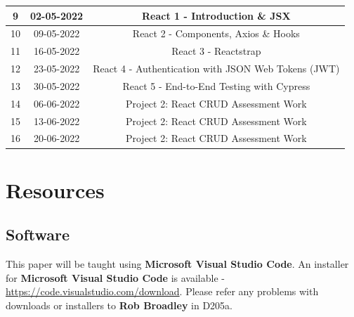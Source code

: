 \documentclass{article}
\begin{document}
\begin{tabular}{|c|c|c|c|}
	\footnotesize 9  & \footnotesize 02-05-2022 & \multicolumn{2}{c|}{\footnotesize React 1 - Introduction \& JSX}                                                                 \\ \hline
	\footnotesize 10 & \footnotesize 09-05-2022 & \multicolumn{2}{c|}{\footnotesize React 2 - Components, Axios \& Hooks}                                                          \\ \hline
	\footnotesize 11 & \footnotesize 16-05-2022 & \multicolumn{2}{c|}{\footnotesize React 3 - Reactstrap}                                                                          \\ \hline
	\footnotesize 12 & \footnotesize 23-05-2022 & \multicolumn{2}{c|}{\footnotesize React 4 - Authentication with JSON Web Tokens (JWT)}                                           \\ \hline
	\footnotesize 13 & \footnotesize 30-05-2022 & \multicolumn{2}{c|}{\footnotesize React 5 - End-to-End Testing with Cypress}                                                     \\ \hline
	\footnotesize 14 & \footnotesize 06-06-2022 & \multicolumn{2}{c|}{\footnotesize Project 2: React CRUD Assessment Work}                                                         \\ \hline
	\footnotesize 15 & \footnotesize 13-06-2022 & \multicolumn{2}{c|}{\footnotesize Project 2: React CRUD Assessment Work}                                                         \\ \hline
	\footnotesize 16 & \footnotesize 20-06-2022 & \multicolumn{2}{c|}{\footnotesize Project 2: React CRUD Assessment Work}                                                         \\ \hline
\end{tabular}

\section*{Resources}

\subsection*{Software}
This paper will be taught using \textbf{Microsoft Visual Studio Code}. An installer for \textbf{Microsoft Visual Studio Code} is available - \href{https://code.visualstudio.com/download}{https://code.visualstudio.com/download}. Please refer any problems with downloads or installers to \textbf{Rob Broadley} in D205a.
\end{document}
